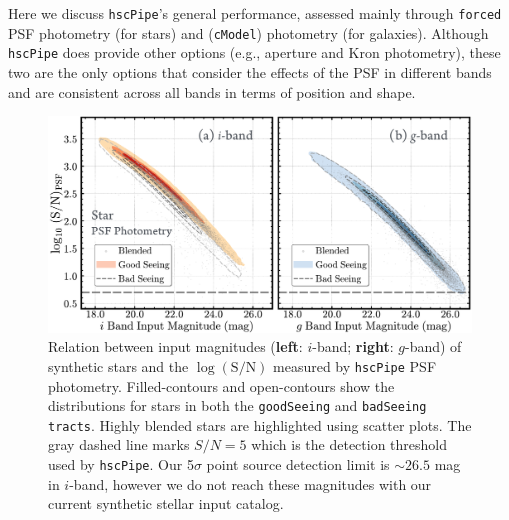 \documentclass[useamsfonts]{pasj01}
\def\hscpipe{\texttt{hscPipe}}
\def\cmodel{\texttt{cModel}}
\def\forced{\texttt{forced}}
\def\tracts{\texttt{tracts}}
\begin{document}
    Here we discuss \hscpipe{}'s general performance, assessed mainly through \forced{} 
    PSF photometry (for stars) and (\cmodel{}) photometry (for galaxies).
    Although \hscpipe{} does provide other options (e.g., aperture and Kron photometry),
    these two are the only options that consider the effects of the PSF in different 
    bands and are consistent across all bands in terms of position and shape. 
    

\begin{figure}
    \begin{center}
        \includegraphics[width=\textwidth]{fig/synpipe_psf_sn}
    \end{center}
    \caption{
        Relation between input magnitudes (\textbf{left}: $i$-band; \textbf{right}:
        $g$-band) of synthetic stars and the $\log (\mathrm{S}/\mathrm{N})$ measured 
        by \hscpipe{} PSF photometry.
        Filled-contours and open-contours show the distributions for
        stars in both the \texttt{goodSeeing} and \texttt{badSeeing} \tracts{}. 
        Highly blended stars are highlighted using scatter plots.
        The gray dashed line marks $S/N = 5$ which is the detection threshold used 
        by \hscpipe{}.  
        Our 5$\sigma$ point source detection limit is ${\sim}26.5$ mag in $i$-band,
        however we do not reach these magnitudes with our current synthetic stellar 
        input catalog.
        }
    \label{fig:star_sn}
\end{figure}
\end{document}
